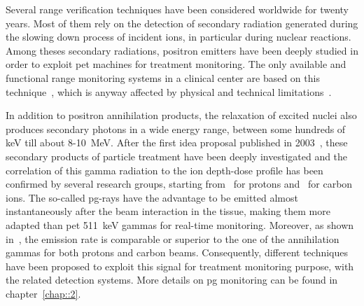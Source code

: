 Several range verification techniques have been considered worldwide for twenty years. Most of them rely on the detection of secondary radiation generated during the slowing down process of incident ions, in particular during nuclear reactions. Among theses secondary radiations, positron emitters have been deeply studied in order to exploit \gls{pet} machines for treatment monitoring. The only available and functional range monitoring systems in a clinical center are based on this technique~\parencite{Enghardt2004, Yamaya2018}, which is anyway affected by physical and technical limitations~\parencite{Parodi2015}.

In addition to positron annihilation products, the relaxation of excited nuclei also produces secondary photons in a wide energy range, between some hundreds of keV till about 8-10~MeV. After the first idea proposal published in 2003~\parencite{Stichelbaut2003}, these secondary products of particle treatment have been deeply investigated and the correlation of this gamma radiation to the ion depth-dose profile has been confirmed by several research groups, starting from~\cite{Min2006} for protons and~\cite{Testa2008} for carbon ions. The so-called \gls{pg}-rays have the advantage to be emitted almost instantaneously after the beam interaction in the tissue, making them more adapted than \gls{pet} 511~keV gammas for real-time monitoring. Moreover, as shown in~\parencite{Robert2013}, the emission rate is comparable or superior to the one of the annihilation gammas for both protons and carbon beams. Consequently, different techniques have been proposed to exploit this signal for treatment monitoring purpose, with the related detection systems. More details on \gls{pg} monitoring can be found in chapter~\ref{chap::2}.

